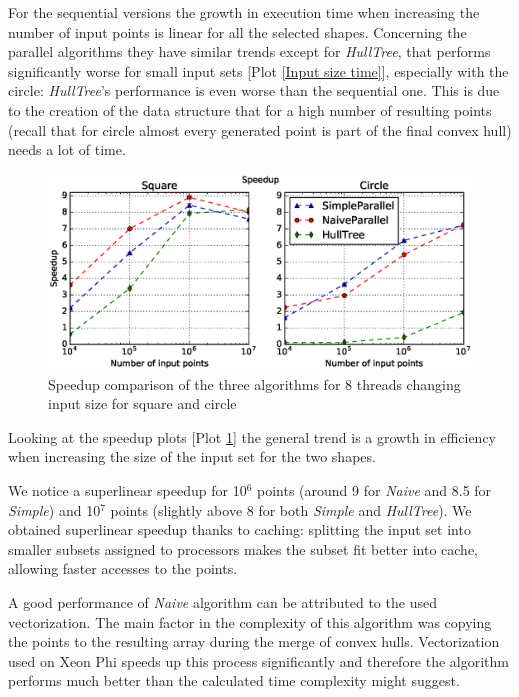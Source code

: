 \documentclass[letterpaper]{article}
\theoremstyle{definition}
\begin{document}
For the sequential versions the growth in execution time when increasing the number of input points is linear for all the selected shapes.
Concerning the parallel algorithms they have similar trends except for \textit{HullTree}, that performs significantly worse for small input sets [Plot \ref{Input size time}], especially with the circle: \textit{HullTree}'s performance is even worse than the sequential one.
This is due to the creation of the data structure that for a high number of resulting points (recall that for circle almost every generated point is part of the final convex hull) needs a lot of time.

\begin{figure}[!ht]\centering
  \includegraphics[scale=0.33]{./plots/speedup_points.eps}
  \caption{Speedup comparison of the three algorithms for 8 threads changing input size for square and circle\label{Input size speedup}}
\end{figure}

Looking at the speedup plots [Plot \ref{Input size speedup}] the general trend is a growth in efficiency when increasing the size of the input set for the two shapes.

We notice a superlinear speedup for 10$^6$ points (around 9 for \textit{Naive} and 8.5 for \textit{Simple}) and 10$^7$ points (slightly above 8 for both \textit{Simple} and \textit{HullTree}).
We obtained superlinear speedup thanks to caching: splitting the input set into smaller subsets assigned to processors makes the subset fit better into cache, allowing faster accesses to the points.

A good performance of \textit{Naive} algorithm can be attributed to the used vectorization.
The main factor in the complexity of this algorithm was copying the points to the resulting array during the merge of convex hulls.
Vectorization used on Xeon Phi speeds up this process significantly and therefore the algorithm performs much better than the calculated time complexity might suggest.
\end{document}
